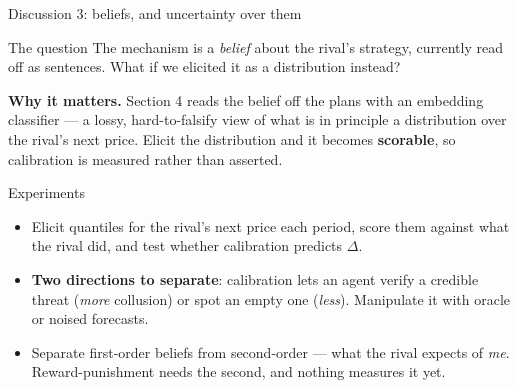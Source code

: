 \documentclass[aspectratio=169,9pt]{beamer}
\newcommand{\orange}[1]{\textcolor{AmazonOrange}{\textbf{#1}}}
\newcommand{\blue}[1]{\textcolor{densityblue}{\textbf{#1}}}
\begin{document}
\begin{frame}{Discussion 3: beliefs, and uncertainty over them}
\begin{block}{The question}
The mechanism is a \textit{belief} about the rival's strategy, currently read off as sentences. What if we
elicited it as a distribution instead?
\end{block}
\pause
\vspace{0.1cm}
\textbf{Why it matters.} Section 4 reads the belief off the plans with an embedding classifier --- a lossy,
hard-to-falsify view of what is in principle a distribution over the rival's next price. Elicit the
distribution and it becomes \orange{scorable}, so calibration is measured rather than asserted.
\pause
\vspace{0.1cm}
\begin{block}{Experiments}
\begin{itemize}
    \item Elicit quantiles for the rival's next price each period, score them against what the rival did, and
    test whether calibration predicts $\Delta$.
    \item \blue{Two directions to separate}: calibration lets an agent verify a credible threat (\textit{more}
    collusion) or spot an empty one (\textit{less}). Manipulate it with oracle or noised forecasts.
    \item Separate first-order beliefs from second-order --- what the rival expects of \textit{me}.
    Reward-punishment needs the second, and nothing measures it yet.
\end{itemize}
\end{block}
\end{frame}
\end{document}
